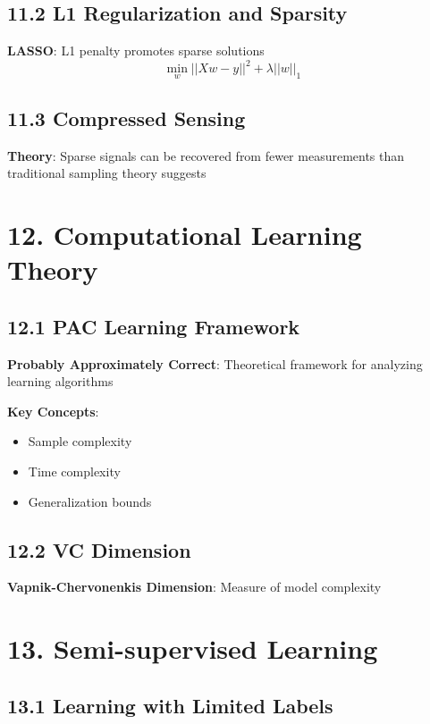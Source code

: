 \documentclass{amsart}
\theoremstyle{plain}
\theoremstyle{definition}
\theoremstyle{remark}
\begin{document}
\subsection{11.2 L1 Regularization and Sparsity}

\textbf{LASSO}: L1 penalty promotes sparse solutions
\[
\min_{w} ||Xw - y||^2 + \lambda ||w||_1
\]

\subsection{11.3 Compressed Sensing}

\textbf{Theory}: Sparse signals can be recovered from fewer measurements than traditional sampling theory suggests

\section{12. Computational Learning Theory}

\subsection{12.1 PAC Learning Framework}

\textbf{Probably Approximately Correct}: Theoretical framework for analyzing learning algorithms

\textbf{Key Concepts}:

\begin{itemize}
	\item Sample complexity
	\item Time complexity
	\item Generalization bounds
\end{itemize}

\subsection{12.2 VC Dimension}

\textbf{Vapnik-Chervonenkis Dimension}: Measure of model complexity

\section{13. Semi-supervised Learning}

\subsection{13.1 Learning with Limited Labels}
\end{document}
